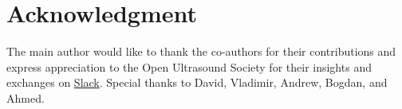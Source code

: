 \documentclass{article}
\begin{document}
\section*{Acknowledgment}

The main author would like to thank the co-authors for their contributions and express appreciation to the Open Ultrasound Society for their insights and exchanges on \href{https://join.slack.com/t/usdevkit/shared_invite/zt-2g501obl-z53YHyGOOMZjeCXuXzjZow}{Slack}. Special thanks to David, Vladimir, Andrew, Bogdan, and Ahmed.

\clearpage



  
\end{document}

